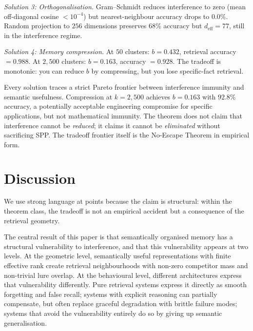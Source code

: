 \documentclass[11pt]{article}
\begin{document}
\textit{Solution 3: Orthogonalisation.} Gram--Schmidt reduces interference to zero (mean off-diagonal cosine $< 10^{-4}$) but nearest-neighbour accuracy drops to $0.0\%$. Random projection to $256$ dimensions preserves $68\%$ accuracy but $d_\text{eff} = 77$, still in the interference regime.

\textit{Solution 4: Memory compression.} At $50$ clusters: $b = 0.432$, retrieval accuracy $= 0.988$. At $2{,}500$ clusters: $b = 0.163$, accuracy $= 0.928$. The tradeoff is monotonic: you can reduce $b$ by compressing, but you lose specific-fact retrieval.

Every solution traces a strict Pareto frontier between interference immunity and semantic usefulness. Compression at $k = 2{,}500$ achieves $b = 0.163$ with $92.8\%$ accuracy, a potentially acceptable engineering compromise for specific applications, but not mathematical immunity. The theorem does not claim that interference cannot be \textit{reduced}; it claims it cannot be \textit{eliminated} without sacrificing SPP. The tradeoff frontier itself is the No-Escape Theorem in empirical form.

\section*{Discussion}

We use strong language at points because the claim is structural: within the theorem class, the tradeoff is not an empirical accident but a consequence of the retrieval geometry.

The central result of this paper is that semantically organised memory has a structural vulnerability to interference, and that this vulnerability appears at two levels. At the geometric level, semantically useful representations with finite effective rank create retrieval neighbourhoods with non-zero competitor mass and non-trivial lure overlap. At the behavioural level, different architectures express that vulnerability differently. Pure retrieval systems express it directly as smooth forgetting and false recall; systems with explicit reasoning can partially compensate, but often replace graceful degradation with brittle failure modes; systems that avoid the vulnerability entirely do so by giving up semantic generalisation.
\end{document}
